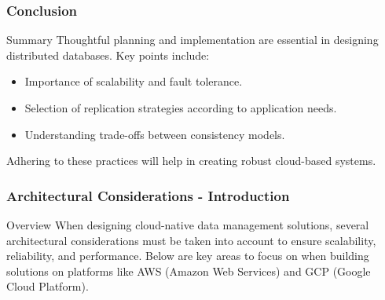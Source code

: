 \documentclass[aspectratio=169]{beamer}
\begin{document}
\begin{frame}
    \frametitle{Conclusion}
    \begin{block}{Summary}
        Thoughtful planning and implementation are essential in designing distributed databases. Key points include:
        \begin{itemize}
            \item Importance of scalability and fault tolerance.
            \item Selection of replication strategies according to application needs.
            \item Understanding trade-offs between consistency models.
        \end{itemize}
        Adhering to these practices will help in creating robust cloud-based systems.
    \end{block}
\end{frame}

\begin{frame}[fragile]
    \frametitle{Architectural Considerations - Introduction}
    \begin{block}{Overview}
    When designing cloud-native data management solutions, several architectural considerations must be taken into account to ensure scalability, reliability, and performance. Below are key areas to focus on when building solutions on platforms like AWS (Amazon Web Services) and GCP (Google Cloud Platform).
    \end{block}
\end{frame}
\end{document}
